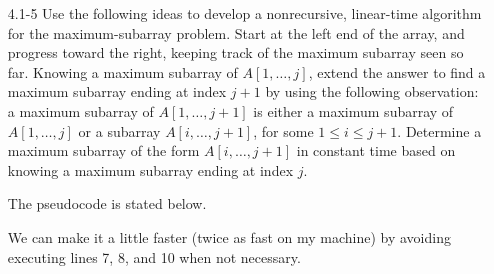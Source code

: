 \begin{enumerate}
\item[4.1{-}5]{Use the following ideas to develop a nonrecursive, linear-time
algorithm for the maximum-subarray problem. Start at the left end of the
array, and progress toward the right, keeping track of the maximum subarray
seen so far. Knowing a maximum subarray of $A[1, \dots, j]$, extend the answer
to find a maximum subarray ending at index $j + 1$ by using the following
observation: a maximum subarray of $A[1, \dots, j + 1]$ is either a maximum
subarray of $A[1, \dots, j]$ or a subarray $A[i, \dots, j + 1]$, for some
$1 \le i \le j + 1$. Determine a maximum subarray of the form $A[i, \dots,
j + 1]$ in constant time based on knowing a maximum subarray ending at index
$j$.}

\begin{framed}
The pseudocode is stated below.\\
\begin{algorithm}[H]
\SetAlgoNoEnd\DontPrintSemicolon
\BlankLine
{}
\end{algorithm}

\vspace{0.5mm}

We can make it a little faster (twice as fast on my machine) by avoiding
executing lines 7, 8, and 10 when not necessary.\\
\begin{algorithm}[H]
\SetAlgoNoEnd\DontPrintSemicolon
\BlankLine
{}
\end{algorithm}
\end{framed}

\end{enumerate}


